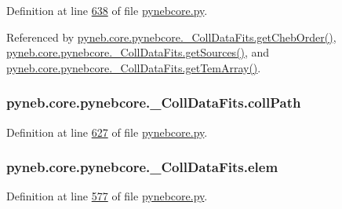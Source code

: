 Definition at line \hyperlink{pynebcore_8py_source_l00638}{638} of file \hyperlink{pynebcore_8py_source}{pynebcore.\-py}.



Referenced by \hyperlink{pynebcore_8py_source_l00711}{pyneb.\-core.\-pynebcore.\-\_\-\-Coll\-Data\-Fits.\-get\-Cheb\-Order()}, \hyperlink{pynebcore_8py_source_l00690}{pyneb.\-core.\-pynebcore.\-\_\-\-Coll\-Data\-Fits.\-get\-Sources()}, and \hyperlink{pynebcore_8py_source_l00897}{pyneb.\-core.\-pynebcore.\-\_\-\-Coll\-Data\-Fits.\-get\-Tem\-Array()}.

\hypertarget{classpyneb_1_1core_1_1pynebcore_1_1___coll_data_fits_ad08da92d019bbc87139f04fb7d765411}{
\subsubsection[{coll\-Path}]{\setlength{\rightskip}{0pt plus 5cm}pyneb.\-core.\-pynebcore.\-\_\-\-Coll\-Data\-Fits.\-coll\-Path}}\label{classpyneb_1_1core_1_1pynebcore_1_1___coll_data_fits_ad08da92d019bbc87139f04fb7d765411}


Definition at line \hyperlink{pynebcore_8py_source_l00627}{627} of file \hyperlink{pynebcore_8py_source}{pynebcore.\-py}.

\hypertarget{classpyneb_1_1core_1_1pynebcore_1_1___coll_data_fits_ac34163e88a48564f05f1cf5aa8d4683a}{
\subsubsection[{elem}]{\setlength{\rightskip}{0pt plus 5cm}pyneb.\-core.\-pynebcore.\-\_\-\-Coll\-Data\-Fits.\-elem}}\label{classpyneb_1_1core_1_1pynebcore_1_1___coll_data_fits_ac34163e88a48564f05f1cf5aa8d4683a}


Definition at line \hyperlink{pynebcore_8py_source_l00577}{577} of file \hyperlink{pynebcore_8py_source}{pynebcore.\-py}.



